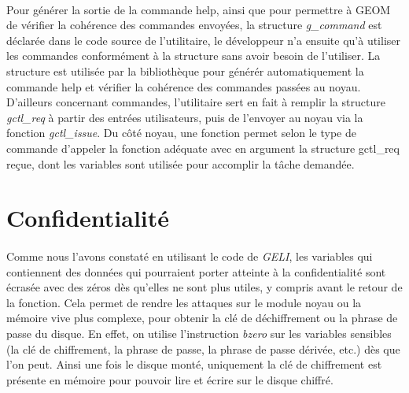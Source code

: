 \paragraph{}
Pour générer la sortie de la commande help, ainsi que pour permettre à GEOM de
vérifier la cohérence des commandes envoyées, la structure {\em g\_command} est
déclarée dans le code source de l'utilitaire, le développeur n'a ensuite qu'à 
utiliser les commandes conformément à la structure sans avoir besoin de
l'utiliser. La structure est utilisée par la bibliothèque pour générér
automatiquement la commande help et vérifier la cohérence des commandes passées
au noyau. D'ailleurs concernant commandes,
l'utilitaire sert en fait à remplir la structure {\em gctl\_req} à partir des
entrées utilisateurs, puis de l'envoyer au noyau via la fonction
{\em gctl\_issue}. Du côté noyau, une fonction permet selon le type de commande
d'appeler la fonction adéquate avec en argument la structure gctl\_req reçue,
dont les variables sont utilisée pour accomplir la tâche demandée.

\section{Confidentialité}
\paragraph{}
Comme nous l'avons constaté en utilisant le code de {\em GELI}, les variables
qui contiennent des données qui pourraient porter atteinte à la confidentialité
sont écrasée avec des zéros dès qu'elles ne sont plus utiles, y compris avant
le retour de la fonction. Cela permet de rendre les attaques sur le module
noyau ou la mémoire vive plus complexe, pour obtenir la clé de déchiffrement ou
la phrase de passe du disque. En effet, on utilise l'instruction {\em bzero}
sur les variables sensibles (la clé de chiffrement, la phrase de passe, la
phrase de passe dérivée, etc.) dès que l'on peut. Ainsi une fois le disque
monté, uniquement la clé de chiffrement est présente en mémoire pour pouvoir
lire et écrire sur le disque chiffré.
